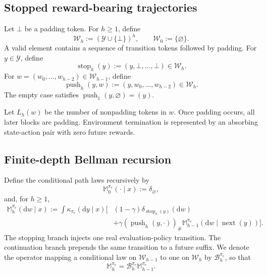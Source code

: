 \documentclass[11pt]{article}
\theoremstyle{definition}
\theoremstyle{remark}
\newcommand{\Yspace}{\mathcal Y}
\newcommand{\Wspace}{\mathcal W}
\newcommand{\nextx}{\operatorname{next}}
\newcommand{\stoptraj}{\operatorname{stop}}
\newcommand{\pushtraj}{\operatorname{push}}
\newcommand{\emptytok}{\bot}
\newcommand{\dd}{\mathrm d}
\newcommand{\Bell}{\mathcal B}
\newcommand{\targetpi}{\pi_e}
\begin{document}
\subsection{Stopped reward-bearing trajectories}

Let $\emptytok$ be a padding token. For $h\geq 1$, define
\begin{equation}
\Wspace_h
:=
(\Yspace\cup\{\emptytok\})^h,
\qquad
\Wspace_0:=\{\varnothing\}.
\end{equation}
A valid element contains a sequence of transition tokens followed by padding.
For $y\in\Yspace$, define
\begin{equation}
\stoptraj_h(y)
:=
(y,\emptytok,\ldots,\emptytok)
\in\Wspace_h.
\label{eq:stop-map}
\end{equation}
For $w=(w_0,\ldots,w_{h-2})\in\Wspace_{h-1}$, define
\begin{equation}
\pushtraj_h(y,w)
:=
(y,w_0,\ldots,w_{h-2})
\in\Wspace_h.
\label{eq:push-map}
\end{equation}
The empty case satisfies $\pushtraj_1(y,\varnothing)=(y)$.

Let $L_h(w)$ be the number of nonpadding tokens in $w$. Once padding occurs,
all later blocks are padding. Environment termination is represented by an
absorbing state-action pair with zero future rewards.

\subsection{Finite-depth Bellman recursion}

Define the conditional path laws recursively by
\begin{equation}
\mathbb M_0^{\targetpi}(\cdot\mid x)
:=
\delta_{\varnothing},
\label{eq:path-base}
\end{equation}
and, for $h\geq 1$,
\begin{equation}
\boxed{
\begin{aligned}
\mathbb M_h^{\targetpi}(\dd w\mid x)
:=
\int \kappa_{\targetpi}(\dd y\mid x)
\Big[
&(1-\gamma)
\delta_{\stoptraj_h(y)}(\dd w)
\\
&+
\gamma
(\pushtraj_h(y,\cdot))_{\#}
\mathbb M_{h-1}^{\targetpi}
(\dd w\mid\nextx(y))
\Big].
\end{aligned}
}
\label{eq:path-bellman}
\end{equation}
The stopping branch injects one real evaluation-policy transition. The
continuation branch prepends the same transition to a future suffix. We denote
the operator mapping a conditional law on $\Wspace_{h-1}$ to one on
$\Wspace_h$ by $\Bell_h^{\targetpi}$, so that
\begin{equation}
\mathbb M_h^{\targetpi}
=
\Bell_h^{\targetpi}\mathbb M_{h-1}^{\targetpi}.
\end{equation}
\end{document}
